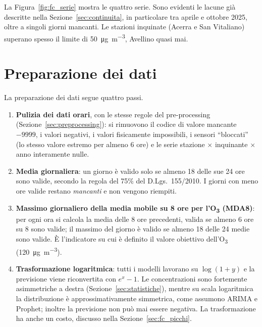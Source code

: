 \documentclass[11pt]{report}
\begin{document}
La Figura~\ref{fig:fc_serie} mostra le quattro serie. Sono evidenti le lacune già
descritte nella Sezione~\ref{sec:continuita}, in particolare tra aprile e ottobre
2025, oltre a singoli giorni mancanti. Le stazioni inquinate (Acerra e San
Vitaliano) superano spesso il limite di \SI{50}{\micro\gram\per\cubic\metre},
Avellino quasi mai.

\section{Preparazione dei dati}
\label{sec:fc_preparazione}

La preparazione dei dati segue quattro passi.
\begin{enumerate}
  \item \textbf{Pulizia dei dati orari}, con le stesse regole del pre-processing
        (Sezione~\ref{sec:preprocessing}): si rimuovono il codice di valore
        mancante $-9999$, i valori negativi, i valori fisicamente impossibili, i
        sensori ``bloccati'' (lo stesso valore estremo per almeno 6 ore) e le serie
        stazione $\times$ inquinante $\times$ anno interamente nulle.
  \item \textbf{Media giornaliera}: un giorno è valido solo se almeno 18 delle sue
        24 ore sono valide, secondo la regola del 75\% del D.Lgs.\ 155/2010. I
        giorni con meno ore valide restano \emph{mancanti} e non vengono riempiti.
  \item \textbf{Massimo giornaliero della media mobile su 8 ore per
        l'O\textsubscript{3} (MDA8)}: per ogni ora si calcola la media delle 8 ore
        precedenti, valida se almeno 6 ore su 8 sono valide; il massimo del giorno è
        valido se almeno 18 delle 24 medie sono valide. È l'indicatore su cui è
        definito il valore obiettivo dell'O\textsubscript{3}
        (\SI{120}{\micro\gram\per\cubic\metre}).
  \item \textbf{Trasformazione logaritmica}: tutti i modelli lavorano su
        $\log(1+y)$ e la previsione viene riconvertita con $e^{x}-1$. Le
        concentrazioni sono fortemente asimmetriche a destra
        (Sezione~\ref{sec:statistiche}), mentre su scala logaritmica la
        distribuzione è approssimativamente simmetrica, come assumono ARIMA e
        Prophet; inoltre la previsione non può mai essere negativa. La
        trasformazione ha anche un costo, discusso nella
        Sezione~\ref{sec:fc_picchi}.
\end{enumerate}
\end{document}
